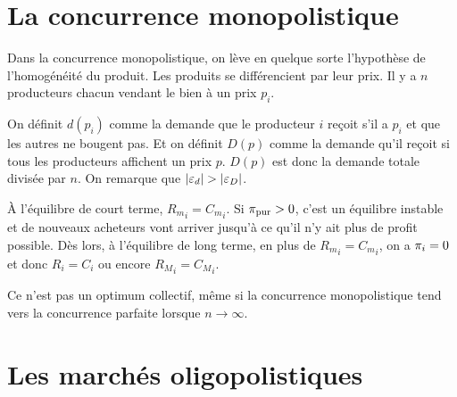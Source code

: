 \section{La concurrence monopolistique}
Dans la concurrence monopolistique, on lève en quelque sorte l'hypothèse de
l'homogénéité du produit.
Les produits se différencient par leur prix.
Il y a $n$ producteurs chacun vendant le bien à un prix $p_i$.

On définit $d(p_i)$ comme la demande que le producteur $i$ reçoit s'il a
$p_i$ et que les autres ne bougent pas.
Et on définit $D(p)$ comme la demande qu'il reçoit si tous
les producteurs affichent un prix $p$.
$D(p)$ est donc la demande totale divisée par $n$.
On remarque que $|\varepsilon_d| > |\varepsilon_D|$.

À l'équilibre de court terme, ${R_m}_i = {C_m}_i$.
Si $\pi_{\mathrm{pur}} > 0$, c'est un équilibre instable et de nouveaux
acheteurs vont arriver jusqu'à ce qu'il n'y ait plus de profit possible.
Dès lors, à l'équilibre de long terme,
en plus de ${R_m}_i = {C_m}_i$, on a $\pi_i = 0$ et donc $R_i = C_i$
ou encore ${R_M}_i = {C_M}_i$.

Ce n'est pas un optimum collectif, même si la concurrence monopolistique
tend vers la concurrence parfaite lorsque $n \to \infty$.

\section{Les marchés oligopolistiques}




